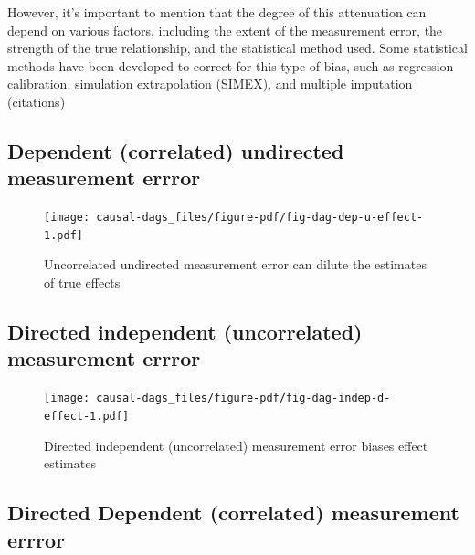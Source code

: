 \documentclass[
  singlecolumn]{report}
\begin{document}
However, it's important to mention that the degree of this attenuation
can depend on various factors, including the extent of the measurement
error, the strength of the true relationship, and the statistical method
used. Some statistical methods have been developed to correct for this
type of bias, such as regression calibration, simulation extrapolation
(SIMEX), and multiple imputation (citations)

\hypertarget{dependent-correlated-undirected-measurement-errror}{%
\subsection{Dependent (correlated) undirected measurement
errror}\label{dependent-correlated-undirected-measurement-errror}}

\begin{figure}

{\centering \texttt{[image: causal-dags\_files/figure-pdf/fig-dag-dep-u-effect-1.pdf]}

}

\caption{\label{fig-dag-dep-u-effect}Uncorrelated undirected measurement
error can dilute the estimates of true effects}

\end{figure}

\hypertarget{directed-independent-uncorrelated-measurement-errror}{%
\subsection{Directed independent (uncorrelated) measurement
errror}\label{directed-independent-uncorrelated-measurement-errror}}

\begin{figure}

{\centering \texttt{[image: causal-dags\_files/figure-pdf/fig-dag-indep-d-effect-1.pdf]}

}

\caption{\label{fig-dag-indep-d-effect}Directed independent
(uncorrelated) measurement error biases effect estimates}

\end{figure}

\hypertarget{directed-dependent-correlated-measurement-errror}{%
\subsection{Directed Dependent (correlated) measurement
errror}\label{directed-dependent-correlated-measurement-errror}}
\end{document}
